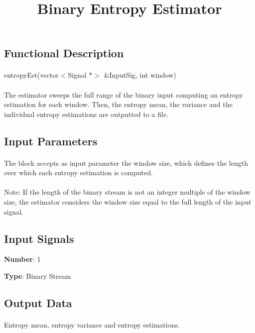\documentclass[]{article}
\title{Binary Entropy Estimator}
\date{}
\begin{document}
\maketitle

\subsection*{Functional Description}
\paragraph{}
entropyEst(vector$<$Signal *$>$ \&InputSig, int window)
\paragraph{}
The estimator sweeps the full range of the binary input computing an entropy estimation for each window. Then, the entropy mean, the variance and the individual entropy estimations are outputted to a file.

\subsection*{Input Parameters}
\paragraph{}
The block accepts as input parameter the window size, which defines the length over which each entropy estimation is computed. 

\paragraph{}
Note: If the length of the binary stream is not an integer multiple of the window size, the estimator considers the window size equal to the full length of the input signal.


\subsection*{Input Signals}

\textbf{Number}: 1

\textbf{Type}: Binary Stream

\subsection*{Output Data} 
\paragraph{}
Entropy mean, entropy variance and entropy estimations.
\end{document}
